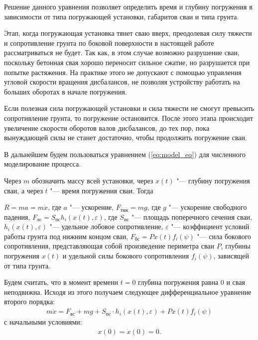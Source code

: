Решение данного уравнения позволяет определить время и глубину погружения в зависимости от типа погружающей установки, габаритов сваи и типа грунта.

Этап, когда погружающая установка тянет сваю вверх, преодолевая силу тяжести и сопротивление грунта по боковой поверхности в настоящей работе
рассматриваться не будет. Так как, в этом случае возможно разрушение сваи, поскольку бетонная свая хорошо переносит сильное сжатие, но разрушается
при попытке растяжения. На практике этого не допускают с помощью управления угловой скорости вращения дисбалансов, не позволяя устройству
работать на больших оборотах в начале погружения.

Если полезная сила погружающей установки и сила тяжести не смогут превысить сопротивление грунта, то погружение остановится. После этого
этапа происходит увеличение скорости оборотов валов дисбалансов, до тех пор, пока вынуждающей силы не станет достаточно, чтобы продолжить
погружение сваи.

В дальнейшем будем пользоваться уравнением (\ref{eq:model_eq}) для численного моделирование процесса.

Через $m$ обозначить массу всей установки, через $x(t)$ "--- глубину погружения сваи, а через $t$ "--- время погружения сваи. Тогда

$R=ma=m\ddot{x}$, где $a$ "--- ускорение,
$F_{\textrm{тяж}}=mg$, где $g$ "--- ускорение свободного падения,
$F_{\textrm{лс}}=S_{\textrm{пс}}h_i(x(t),\varepsilon)$, где $S_{\textrm{пс}}$ "--- площадь поперечного сечения сваи, $h_i(x(t),\varepsilon)$ "--- удельное лобовое сопротивление,
$\varepsilon$ "--- коэффициент условий работы грунта под нижним концом сваи,
$F_{\textrm{бс}}=Px(t)f_i(\psi)$ "--- сила бокового сопротивления, представляющая собой произведение периметра сваи $P$, глубины погружения $x(t)$
и удельной силы бокового сопротивления $f_i(\psi)$, зависящей от типа грунта.

Будем считать, что в момент времени $t=0$ глубина погружения равна $0$ и свая неподвижна. Исходя из этого получаем следующее дифференциальное уравнение второго порядка:
\begin{equation}\label{eq:diff_2}
    \begin{gathered}
        m\ddot{x} = F_{\textrm{вс}} + mg + S_{\textrm{пс}} \cdot h_i(x(t),\varepsilon) + Px(t)f_i(\psi)
    \end{gathered}
\end{equation}
с начальными условиями:
\begin{equation}\label{eq:diff_start}
    \begin{gathered}
        x(0) = \dot{x}(0) = 0.
    \end{gathered}
\end{equation}

